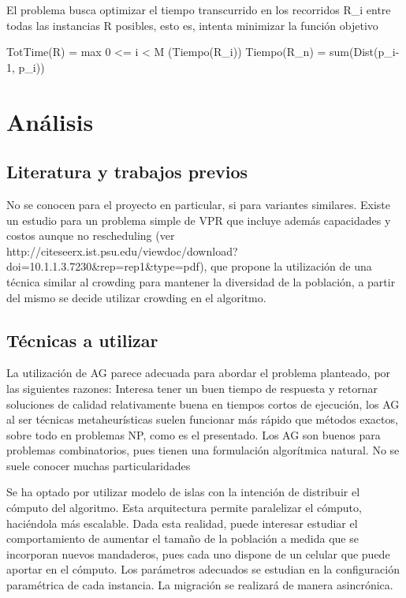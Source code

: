 \documentclass[9pt,conference]{IEEEtran}
\begin{document}
	El problema busca optimizar el tiempo transcurrido en los recorridos R_i entre todas las instancias R posibles, esto es, intenta minimizar la función objetivo


	TotTime(R) = max 0 <= i < M (Tiempo(R_i))
	Tiempo(R_n) = sum(Dist(p_{i-1}, p_i))



	\section{Análisis}

	\subsection{Literatura y trabajos previos}

		No se conocen para el proyecto en particular, si para variantes similares. Existe un estudio para un problema simple de VPR que incluye además capacidades y costos aunque no rescheduling (ver http://citeseerx.ist.psu.edu/viewdoc/download?doi=10.1.1.3.7230&rep=rep1&type=pdf), que propone la utilización de una técnica similar al crowding para mantener la diversidad de la población, a partir del mismo se decide utilizar crowding en el algoritmo.


	\subsection{Técnicas a utilizar}

		La utilización de AG parece adecuada para abordar el problema planteado, por las siguientes razones:
			Interesa tener un buen tiempo de respuesta y retornar soluciones de calidad relativamente buena en tiempos cortos de ejecución, los AG al ser técnicas metaheurísticas suelen funcionar más rápido que métodos exactos, sobre todo en problemas NP, como es el presentado.
			Los AG son buenos para problemas combinatorios, pues tienen una formulación algorítmica natural.
			No se suele conocer muchas particularidades 

		Se ha optado por utilizar modelo de islas con la intención de distribuir el cómputo del algoritmo. Esta arquitectura permite paralelizar el cómputo, haciéndola más escalable. Dada esta realidad, puede interesar estudiar el comportamiento de aumentar el tamaño de la población a medida que se incorporan nuevos mandaderos, pues cada uno dispone de un celular que puede aportar en el cómputo. Los parámetros adecuados se estudian en la configuración paramétrica de cada instancia. La migración se realizará de manera asincrónica.
\end{document}
